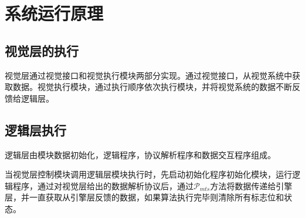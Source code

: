 \documentclass[journal,UTF8]{IEEEtran}
\begin{document}
\section{系统运行原理}
\label{Execution}
\subsection{视觉层的执行}
视觉层通过视觉接口和视觉执行模块两部分实现。通过视觉接口，从视觉系统中获取数据。视觉执行模块，通过执行顺序依次执行模块，并将视觉系统的数据不断反馈给逻辑层。





\subsection{逻辑层执行}
逻辑层由模块数据初始化，逻辑程序，协议解析程序和数据交互程序组成。

当视觉层控制模块调用逻辑层模块执行时，先启动初始化程序初始化模块，运行逻辑程序，通过对视觉层给出的数据解析协议后，通过$\mathcal{P}_{mts}$方法将数据传递给引擎层，并一直获取从引擎层反馈的数据，如果算法执行完毕则清除所有标志位和状态。







\end{document}
